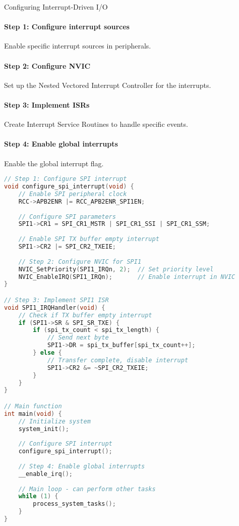 \begin{KR}{Configuring Interrupt-Driven I/O}
\paragraph{Step 1: Configure interrupt sources}
Enable specific interrupt sources in peripherals.
\paragraph{Step 2: Configure NVIC}
Set up the Nested Vectored Interrupt Controller for the interrupts.
\paragraph{Step 3: Implement ISRs}
Create Interrupt Service Routines to handle specific events.
\paragraph{Step 4: Enable global interrupts}
Enable the global interrupt flag.

\begin{lstlisting}[language=C, style=basesmol]
// Step 1: Configure SPI interrupt
void configure_spi_interrupt(void) {
    // Enable SPI peripheral clock
    RCC->APB2ENR |= RCC_APB2ENR_SPI1EN;
    
    // Configure SPI parameters
    SPI1->CR1 = SPI_CR1_MSTR | SPI_CR1_SSI | SPI_CR1_SSM;
    
    // Enable SPI TX buffer empty interrupt
    SPI1->CR2 |= SPI_CR2_TXEIE;
    
    // Step 2: Configure NVIC for SPI1
    NVIC_SetPriority(SPI1_IRQn, 2);  // Set priority level
    NVIC_EnableIRQ(SPI1_IRQn);       // Enable interrupt in NVIC
}

// Step 3: Implement SPI1 ISR
void SPI1_IRQHandler(void) {
    // Check if TX buffer empty interrupt
    if (SPI1->SR & SPI_SR_TXE) {
        if (spi_tx_count < spi_tx_length) {
            // Send next byte
            SPI1->DR = spi_tx_buffer[spi_tx_count++];
        } else {
            // Transfer complete, disable interrupt
            SPI1->CR2 &= ~SPI_CR2_TXEIE;
        }
    }
}

// Main function
int main(void) {
    // Initialize system
    system_init();
    
    // Configure SPI interrupt
    configure_spi_interrupt();
    
    // Step 4: Enable global interrupts
    __enable_irq();
    
    // Main loop - can perform other tasks
    while (1) {
        process_system_tasks();
    }
}
\end{lstlisting}
\end{KR}

